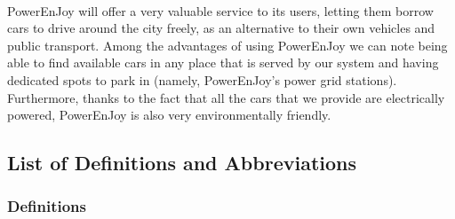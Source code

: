 \documentclass[english]{article}
\begin{document}
\paragraph{}
PowerEnJoy will offer a very valuable service to its users, letting them borrow cars to drive around the city freely, as an alternative to their own vehicles and public transport.
Among the advantages of using PowerEnJoy we can note being able to find available cars in any place that is served by our system and having dedicated spots to park in (namely, PowerEnJoy's power grid stations).
Furthermore, thanks to the fact that all the cars that we provide are electrically powered, PowerEnJoy is also very environmentally friendly.

%

\newpage
\subsection{List of Definitions and Abbreviations}

\subsubsection{Definitions}
\end{document}
